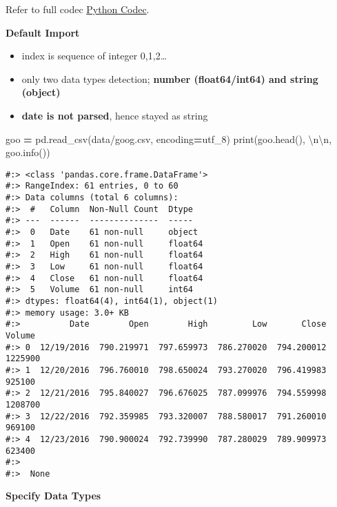 \documentclass[
]{book}
\newenvironment{Shaded}{\begin{snugshade}}{\end{snugshade}}
\newcommand{\BuiltInTok}[1]{#1}
\newcommand{\CharTok}[1]{\textcolor[rgb]{0.5,0.5,0.5}{#1}}
\newcommand{\NormalTok}[1]{#1}
\newcommand{\OperatorTok}[1]{\textcolor[rgb]{0.43,0.43,0.43}{\textbf{#1}}}
\newcommand{\StringTok}[1]{\textcolor[rgb]{0.5,0.5,0.5}{#1}}
\providecommand{\tightlist}{%
  \setlength{\itemsep}{0pt}\setlength{\parskip}{0pt}}
\begin{document}
Refer to full codec \href{https://docs.python.org/3/library/codecs.html\#standard-encodings}{Python Codec}.

\textbf{Default Import}

\begin{itemize}
\tightlist
\item
  index is sequence of integer 0,1,2\ldots{}\\
\item
  only two data types detection; \textbf{number (float64/int64) and string (object)}\\
\item
  \textbf{date is not parsed}, hence stayed as string
\end{itemize}

\begin{Shaded}
\begin{Highlighting}[]
\NormalTok{goo }\OperatorTok{=}\NormalTok{ pd.read\_csv(}\StringTok{\textquotesingle{}data/goog.csv\textquotesingle{}}\NormalTok{, encoding}\OperatorTok{=}\StringTok{\textquotesingle{}utf\_8\textquotesingle{}}\NormalTok{)}
\BuiltInTok{print}\NormalTok{(goo.head(), }\StringTok{\textquotesingle{}}\CharTok{\textbackslash{}n\textbackslash{}n}\StringTok{\textquotesingle{}}\NormalTok{,}
\NormalTok{      goo.info())}
\end{Highlighting}
\end{Shaded}

\begin{verbatim}
#:> <class 'pandas.core.frame.DataFrame'>
#:> RangeIndex: 61 entries, 0 to 60
#:> Data columns (total 6 columns):
#:>  #   Column  Non-Null Count  Dtype  
#:> ---  ------  --------------  -----  
#:>  0   Date    61 non-null     object 
#:>  1   Open    61 non-null     float64
#:>  2   High    61 non-null     float64
#:>  3   Low     61 non-null     float64
#:>  4   Close   61 non-null     float64
#:>  5   Volume  61 non-null     int64  
#:> dtypes: float64(4), int64(1), object(1)
#:> memory usage: 3.0+ KB
#:>          Date        Open        High         Low       Close   Volume
#:> 0  12/19/2016  790.219971  797.659973  786.270020  794.200012  1225900
#:> 1  12/20/2016  796.760010  798.650024  793.270020  796.419983   925100
#:> 2  12/21/2016  795.840027  796.676025  787.099976  794.559998  1208700
#:> 3  12/22/2016  792.359985  793.320007  788.580017  791.260010   969100
#:> 4  12/23/2016  790.900024  792.739990  787.280029  789.909973   623400 
#:> 
#:>  None
\end{verbatim}

\textbf{Specify Data Types}
\end{document}
